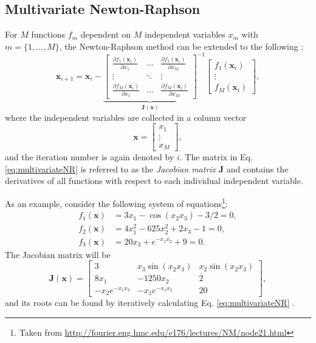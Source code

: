 \subsection{Multivariate Newton-Raphson}\label{sec:multivariateNR}
For $M$ functions $f_m$ dependent on $M$ independent variables $x_m$ with $m = \{1, \hdots, M\}$, the Newton-Raphson method can be extended to the following \SWcomment[citation?]:
\begin{equation}\label{eq:multivariateNR}
    \mathbf{x}_{i+1} = 
    \mathbf{x}_i - 
    {\underbrace{\begin{bmatrix}
        \frac{\partial f_1(\mathbf{x}_i)}{\partial x_1} & \hdots & \frac{\partial f_1(\mathbf{x}_i)}{\partial x_M}\\
        \vdots & \ddots & \vdots\\
        \frac{\partial f_M(\mathbf{x}_i)}{\partial x_1} & \hdots & \frac{\partial f_M(\mathbf{x}_i)}{\partial x_M}
    \end{bmatrix}}_{\mathbf{J}(\mathbf{x})}}^{-1}
    \begin{bmatrix}
        f_1(\mathbf{x}_i)\\
        \vdots\\
        f_M(\mathbf{x}_i)
    \end{bmatrix},
\end{equation}
where the independent variables are collected in a column vector
\begin{equation}
    \mathbf{x} = \begin{bmatrix}
        x_1\\
        \vdots\\
        x_M
    \end{bmatrix},
\end{equation}
and the iteration number is again denoted by $i$.
The matrix in Eq. \eqref{eq:multivariateNR} is referred to as the \textit{Jacobian matrix} $\mathbf{J}$ and contains the derivatives of all functions with respect to each individual independent variable. 

As an example, consider the following system of equations\footnote{Taken from \url{http://fourier.eng.hmc.edu/e176/lectures/NM/node21.html}}:
\begin{subequations}
    \begin{align}
        f_1(\mathbf{x}) &= 3 x_1 - \cos(x_2x_3) - 3/2 = 0,\\
        f_2(\mathbf{x}) &= 4x_1^2 - 625 x_2^2 + 2x_3-1 = 0,\\
        f_3(\mathbf{x}) &= 20 x_3 + e^{-x_1x_2}+9 = 0.
    \end{align} 
\end{subequations}
The Jacobian matrix will be 
\begin{equation*}
    \mathbf{J}(\mathbf{x}) = \begin{bmatrix}
        3 & x_3 \sin (x_2x_3) & x_2 \sin(x_2x_3)\\
        8x_1 & -1250 x_2 & 2\\
        -x_2e^{-x_1x_2} & -x_1e^{-x_1x_2} & 20
    \end{bmatrix},
\end{equation*}
and its roots can be found by iteratively calculating Eq. \eqref{eq:multivariateNR} .

